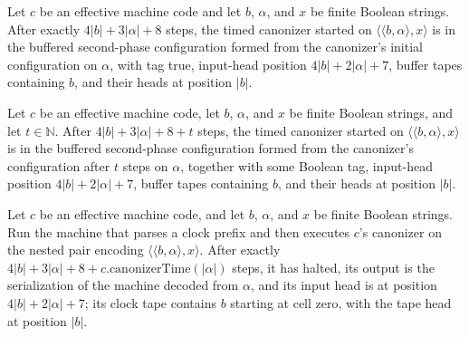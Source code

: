 \begin{lemma}
\label{Turing.timedCanon_start}
\leanok
{}
Let $c$ be an effective machine code and let $b$, $\alpha$, and $x$ be finite Boolean
strings. After exactly $4|b|+3|\alpha|+8$ steps, the timed canonizer started on
$\langle\langle b,\alpha\rangle,x\rangle$ is in the buffered second-phase configuration
formed from the canonizer's initial configuration on $\alpha$, with tag true, input-head
position $4|b|+2|\alpha|+7$, buffer tapes containing $b$, and their heads at position
$|b|$.
\end{lemma}

\begin{lemma}
\label{Turing.timedCanon_run}
\leanok
{}
Let $c$ be an effective machine code, let $b$, $\alpha$, and $x$ be finite Boolean
strings, and let $t\in\mathbb{N}$. After $4|b|+3|\alpha|+8+t$ steps, the timed canonizer
started on $\langle\langle b,\alpha\rangle,x\rangle$ is in the buffered second-phase
configuration formed from the canonizer's configuration after $t$ steps on $\alpha$,
together with some Boolean tag, input-head position $4|b|+2|\alpha|+7$, buffer tapes
containing $b$, and their heads at position $|b|$.
\end{lemma}

\begin{lemma}
\label{Turing.timedCanon_complete}
\leanok
{}
Let $c$ be an effective machine code, and let $b$, $\alpha$, and $x$ be finite Boolean
strings. Run the machine that parses a clock prefix and then executes $c$’s canonizer on
the nested pair encoding $\langle\langle b,\alpha\rangle,x\rangle$. After exactly
$4|b|+3|\alpha|+8+c.\mathrm{canonizerTime}(|\alpha|)$ steps, it has halted, its output
is the serialization of the machine decoded from $\alpha$, and its input head is at
position $4|b|+2|\alpha|+7$; its clock tape contains $b$ starting at cell zero, with the
tape head at position $|b|$.
\end{lemma}

